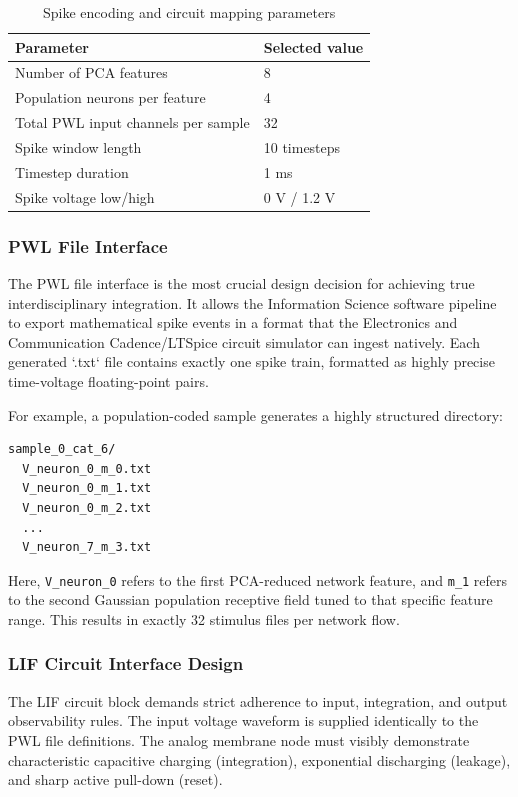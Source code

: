 \documentclass{ieeeaccess}
\begin{document}
\begin{table}[H]
\centering
\caption{Spike encoding and circuit mapping parameters}
\label{tab:encodingparams}
\begin{tabular}{|p{}|p{}|}
\hline
\textbf{Parameter} & \textbf{Selected value} \\
\hline
Number of PCA features & 8 \\
\hline
Population neurons per feature & 4 \\
\hline
Total PWL input channels per sample & 32 \\
\hline
Spike window length & 10 timesteps \\
\hline
Timestep duration & 1 ms \\
\hline
Spike voltage low/high & 0 V / 1.2 V \\
\hline
\end{tabular}
\end{table}

\subsubsection{PWL File Interface}

The PWL file interface is the most crucial design decision for achieving true interdisciplinary integration. It allows the Information Science software pipeline to export mathematical spike events in a format that the Electronics and Communication Cadence/LTSpice circuit simulator can ingest natively. Each generated `.txt` file contains exactly one spike train, formatted as highly precise time-voltage floating-point pairs.

For example, a population-coded sample generates a highly structured directory:
\begin{verbatim}
sample_0_cat_6/
  V_neuron_0_m_0.txt
  V_neuron_0_m_1.txt
  V_neuron_0_m_2.txt
  ...
  V_neuron_7_m_3.txt
\end{verbatim}
Here, \texttt{V\_neuron\_0} refers to the first PCA-reduced network feature, and \texttt{m\_1} refers to the second Gaussian population receptive field tuned to that specific feature range. This results in exactly 32 stimulus files per network flow.

\subsubsection{LIF Circuit Interface Design}

The LIF circuit block demands strict adherence to input, integration, and output observability rules. The input voltage waveform is supplied identically to the PWL file definitions. The analog membrane node must visibly demonstrate characteristic capacitive charging (integration), exponential discharging (leakage), and sharp active pull-down (reset). 
\end{document}
